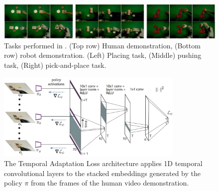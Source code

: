 \begin{figure}[t]
    \centering
    \includegraphics[width=\textwidth]{figures/images/daml/tasks.jpg}
    \caption{Tasks performed in \cite{yu2018daml}. (Top row) Human demonstration, (Bottom row) robot demonstration. (Left) Placing task, (Middle) pushing task, (Right) pick-and-place task.}
    \label{fig:daml_tasks}
\end{figure}

\begin{figure}[t]
    \centering
    \includegraphics[width=0.8\textwidth]{figures/images/daml/daml_temporal_adaptation_loss.jpg}
    \caption{The Temporal Adaptation Loss architecture applies 1D temporal convolutional layers to the stacked embeddings generated by the policy $\pi$ from the frames of the human video demonstration.}
    \label{fig:daml_temporal_adaptation_loss}
\end{figure}